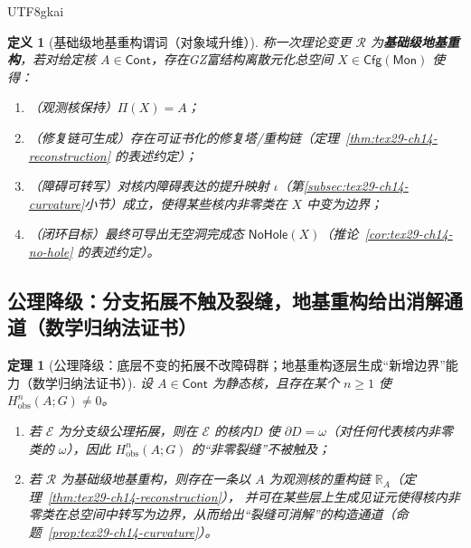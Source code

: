 \documentclass[12pt]{article}
\newtheorem{definition}{定义}[section]
\newtheorem{theorem}{定理}[section]
\newcommand{\KouJing}{\texorpdfstring{表述约定}{表述约定}}
\newcommand{\GZMonization}{\texorpdfstring{GZ富结构离散元化}{GZ富结构离散元化}}
\begin{document}
\begin{CJK*}{UTF8}{gkai}
\begin{definition}[基础级地基重构谓词（对象域升维）]
称一次理论变更 $\mathcal{R}$ 为\textbf{基础级地基重构}，若对给定核 $A\in\mathsf{Cont}$，存在\GZMonization{}总空间 $X\in\mathsf{Cfg}(\mathsf{Mon})$
  使得：
\begin{enumerate}
  \item （观测核保持）$\Pi(X)=A$；
  \item （修复链可生成）存在可证书化的修复塔/重构链（定理~\ref{thm:tex29-ch14-reconstruction} 的\KouJing）；
  \item （障碍可转写）对核内障碍表达的提升映射 $\iota$（第\ref{subsec:tex29-ch14-curvature}小节）成立，使得某些核内非零类在 $X$ 中变为边界；
  \item （闭环目标）最终可导出无空洞完成态 $\mathsf{NoHole}(X)$（推论~\ref{cor:tex29-ch14-no-hole} 的\KouJing）。
\end{enumerate}
\end{definition}

\subsection{公理降级：分支拓展不触及裂缝，地基重构给出消解通道（数学归纳法证书）}
\label{subsec:tex29-ch15-axiom}

\begin{theorem}[公理降级：底层不变的拓展不改障碍群；地基重构逐层生成“新增边界”能力（数学归纳法证书）]
\label{thm:tex29-ch15-branch-vs-foundation}
设 $A\in\mathsf{Cont}$ 为静态核，且存在某个 $n\ge 1$ 使 $H^n_{\mathrm{obs}}(A;G)\neq 0$。
\begin{enumerate}
  \item 若 $\mathcal{E}$ 为分支级公理拓展，则在 $\mathcal{E}$ 的核内 $D$ 使 $\partial D=\omega$（对任何代表核内非零类的 $\omega$），因此
    $H^n_{\mathrm{obs}}(A;G)$ 的“非零裂缝”不被触及；
  \item 若 $\mathcal{R}$ 为基础级地基重构，则存在一条以 $A$ 为观测核的重构链 $\mathbb{R}_A$（定理~\ref{thm:tex29-ch14-reconstruction}），
    并可在某些层上生成见证元使得核内非零类在总空间中转写为边界，从而给出“裂缝可消解”的构造通道（命题~\ref{prop:tex29-ch14-curvature}）。
\end{enumerate}
\end{theorem}


\end{CJK*}
\end{document}

